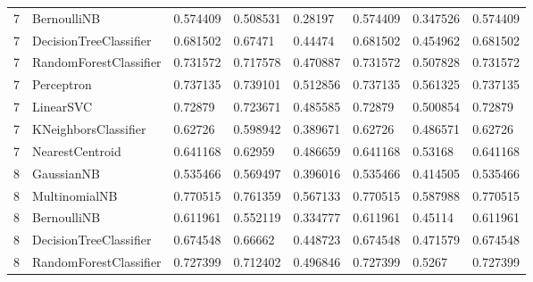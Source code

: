 \documentclass{article}
\begin{document}
\begin{table}[h]
\begin{tabular}{llllllll}
7             & BernoulliNB            & 0.574409          & 0.508531          & 0.28197               & 0.574409              & 0.347526                 & 0.574409                 \\
7             & DecisionTreeClassifier & 0.681502          & 0.67471           & 0.44474               & 0.681502              & 0.454962                 & 0.681502                 \\
7             & RandomForestClassifier & 0.731572          & 0.717578          & 0.470887              & 0.731572              & 0.507828                 & 0.731572                 \\
7             & Perceptron             & 0.737135          & 0.739101          & 0.512856              & 0.737135              & 0.561325                 & 0.737135                 \\
7             & LinearSVC              & 0.72879           & 0.723671          & 0.485585              & 0.72879               & 0.500854                 & 0.72879                  \\
7             & KNeighborsClassifier   & 0.62726           & 0.598942          & 0.389671              & 0.62726               & 0.486571                 & 0.62726                  \\
7             & NearestCentroid        & 0.641168          & 0.62959           & 0.486659              & 0.641168              & 0.53168                  & 0.641168                 \\
8             & GaussianNB             & 0.535466          & 0.569497          & 0.396016              & 0.535466              & 0.414505                 & 0.535466                 \\
8             & MultinomialNB          & 0.770515          & 0.761359          & 0.567133              & 0.770515              & 0.587988                 & 0.770515                 \\
8             & BernoulliNB            & 0.611961          & 0.552119          & 0.334777              & 0.611961              & 0.45114                  & 0.611961                 \\
8             & DecisionTreeClassifier & 0.674548          & 0.66662           & 0.448723              & 0.674548              & 0.471579                 & 0.674548                 \\
8             & RandomForestClassifier & 0.727399          & 0.712402          & 0.496846              & 0.727399              & 0.5267                   & 0.727399                 \\

\end{tabular}
\end{table}
\end{document}
